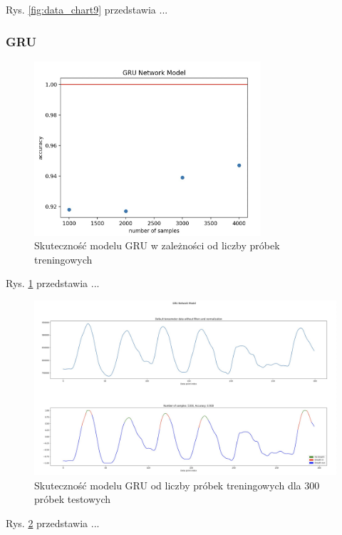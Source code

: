 \documentclass{article}
\begin{document}
Rys. \ref{fig:data_chart9} przedstawia ...

\subsubsection{GRU}

\begin{figure}[H]
    \centering
    \includegraphics[width=0.75\textwidth]{gru/dokladnosc.png}
    \caption{Skuteczność modelu GRU w zależności od liczby próbek treningowych}
    \label{fig:data_chart10}
\end{figure}

Rys. \ref{fig:data_chart10} przedstawia ...

\begin{figure}[H]
    \centering
    \includegraphics[width=\textwidth]{gru/skutecznosc.png}
    \caption{Skuteczność modelu GRU od liczby próbek treningowych dla 300 próbek testowych}
    \label{fig:data_chart11}
\end{figure}

Rys. \ref{fig:data_chart11} przedstawia ...
\end{document}
